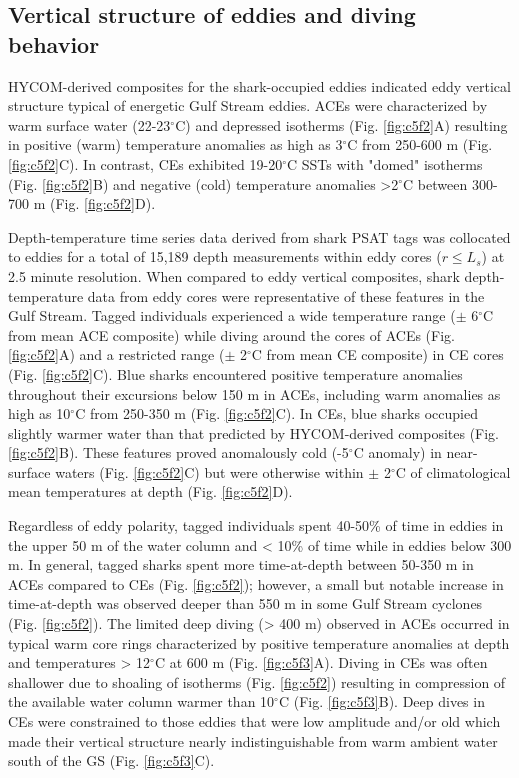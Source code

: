 \subsection{Vertical structure of eddies and diving behavior}

HYCOM-derived composites for the shark-occupied eddies indicated eddy vertical structure typical of energetic Gulf Stream eddies. ACEs were characterized by warm surface water (22-23$^\circ$C) and depressed isotherms (Fig. \cref{fig:c5f2}A) resulting in positive (warm) temperature anomalies as high as 3$^\circ$C from 250-600 m (Fig. \cref{fig:c5f2}C). In contrast, CEs exhibited 19-20$^\circ$C SSTs with "domed" isotherms (Fig. \cref{fig:c5f2}B) and negative (cold) temperature anomalies >2$^\circ$C between 300-700 m (Fig. \cref{fig:c5f2}D).

Depth-temperature time series data derived from shark PSAT tags was collocated to eddies for a total of 15,189 depth measurements within eddy cores ($r \leq L_s$) at 2.5 minute resolution. When compared to eddy vertical composites, shark depth-temperature data from eddy cores were representative of these features in the Gulf Stream. Tagged individuals experienced a wide temperature range ($\pm$ 6$^\circ$C from mean ACE composite) while diving around the cores of ACEs (Fig. \cref{fig:c5f2}A) and a restricted range ($\pm$ 2$^\circ$C from mean CE composite) in CE cores (Fig. \cref{fig:c5f2}C). Blue sharks encountered positive temperature anomalies throughout their excursions below 150 m in ACEs, including warm anomalies as high as 10$^\circ$C from 250-350 m (Fig. \cref{fig:c5f2}C). In CEs, blue sharks occupied slightly warmer water than that predicted by HYCOM-derived composites (Fig. \cref{fig:c5f2}B). These features proved anomalously cold (-5$^\circ$C anomaly) in near-surface waters (Fig. \cref{fig:c5f2}C) but were otherwise within $\pm$ 2$^\circ$C of climatological mean temperatures at depth (Fig. \cref{fig:c5f2}D). 

Regardless of eddy polarity, tagged individuals spent 40-50\% of time in eddies in the upper 50 m of the water column and < 10\% of time while in eddies below 300 m. In general, tagged sharks spent more time-at-depth between 50-350 m in ACEs compared to CEs (Fig. \cref{fig:c5f2}); however, a small but notable increase in time-at-depth was observed deeper than 550 m in some Gulf Stream cyclones (Fig. \cref{fig:c5f2}). The limited deep diving (> 400 m) observed in ACEs occurred in typical warm core rings characterized by positive temperature anomalies at depth and temperatures > 12$^\circ$C at 600 m (Fig. \cref{fig:c5f3}A). Diving in CEs was often shallower due to shoaling of isotherms (Fig. \cref{fig:c5f2}) resulting in compression of the available water column warmer than 10$^\circ$C (Fig. \cref{fig:c5f3}B). Deep dives in CEs were constrained to those eddies that were low amplitude and/or old which made their vertical structure nearly indistinguishable from warm ambient water south of the GS (Fig. \cref{fig:c5f3}C).

